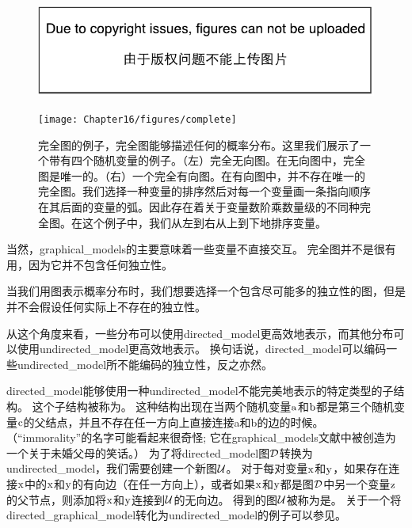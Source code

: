 \begin{figure}[!htb]
\ifOpenSource
\centerline{\includegraphics{figure.pdf}}
\else
	\centerline{\texttt{[image: Chapter16/figures/complete]}}	
\fi
	\caption{完全图的例子，完全图能够描述任何的概率分布。这里我们展示了一个带有四个随机变量的例子。（左）完全无向图。在无向图中，完全图是唯一的。（右）一个完全有向图。在有向图中，并不存在唯一的完全图。我们选择一种变量的排序然后对每一个变量画一条指向顺序在其后面的变量的弧。因此存在着关于变量数阶乘数量级的不同种完全图。在这个例子中，我们从左到右从上到下地排序变量。}
	\label{fig:complete}
\end{figure}


当然，\gls{graphical_models}的主要意味着一些变量不直接交互。 
完全图并不是很有用，因为它并不包含任何独立性。


当我们用图表示概率分布时，我们想要选择一个包含尽可能多的独立性的图，但是并不会假设任何实际上不存在的独立性。


从这个角度来看，一些分布可以使用\gls{directed_model}更高效地表示，而其他分布可以使用\gls{undirected_model}更高效地表示。
换句话说，\gls{directed_model}可以编码一些\gls{undirected_model}所不能编码的独立性，反之亦然。


\gls{directed_model}能够使用一种\gls{undirected_model}不能完美地表示的特定类型的子结构。
这个子结构被称为。
这种结构出现在当两个随机变量$\mathrm{a}$和$\mathrm{b}$都是第三个随机变量$\mathrm{c}$的父结点，并且不存在任一方向上直接连接a和b的边的时候。
（``\gls{immorality}''的名字可能看起来很奇怪; 它在\gls{graphical_models}文献中被创造为一个关于未婚父母的笑话。）
为了将\gls{directed_model}图$\mathcal{D}$转换为\gls{undirected_model}，我们需要创建一个新图$\mathcal{U}$。
对于每对变量$\mathrm{x}$和$\mathrm{y}$，如果存在连接$\mathrm{x}$中的$\mathrm{x}$和$\mathrm{y}$的有向边（在任一方向上），或者如果$\mathrm{x}$和$\mathrm{y}$都是图$\mathcal{D}$中另一个变量$\mathrm{z}$的父节点，则添加将$\mathrm{x}$和$\mathrm{y}$连接到$\mathcal{U}$的无向边。 
得到的图$\mathcal{U}$被称为是。
关于一个将\gls{directed_graphical_model}转化为\gls{undirected_model}的例子可以参见。


